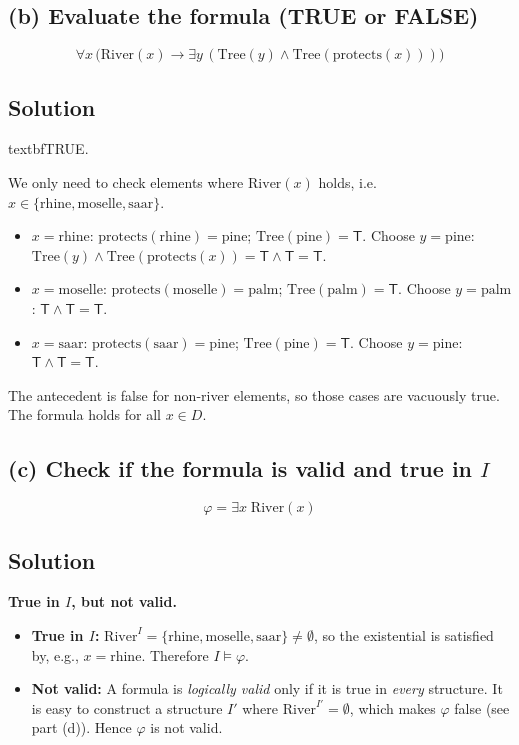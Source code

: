 \documentclass[11pt,a4paper]{article}
\newenvironment{solution}{%
	\begin{tcolorbox}[
		breakable,
		colback=green!4,
		colframe=green!50!black,
		fonttitle=\bfseries,
		title={ Solution},
		left=6pt, right=6pt, top=4pt, bottom=4pt
		]%
	}{%
	\end{tcolorbox}%
}
\begin{document}
\subsection*{(b) Evaluate the formula (TRUE or FALSE)}
\[
\forall x\,\bigl(\mathrm{River}(x) \to \exists y\,(\mathrm{Tree}(y) \land \mathrm{Tree}(\mathrm{protects}(x)))\bigr)
\]

\subsection*{Solution}
\begin{solution}
textbf{TRUE.}

We only need to check elements where $\mathrm{River}(x)$ holds, i.e.\ $x \in \{\text{rhine},\text{moselle},\text{saar}\}$.

\begin{itemize}
  \item $x = \text{rhine}$: $\mathrm{protects}(\text{rhine}) = \text{pine}$; $\mathrm{Tree}(\text{pine}) = \mathsf{T}$.
        Choose $y = \text{pine}$: $\mathrm{Tree}(y) \land \mathrm{Tree}(\mathrm{protects}(x)) = \mathsf{T} \land \mathsf{T} = \mathsf{T}$. \checkmark
  \item $x = \text{moselle}$: $\mathrm{protects}(\text{moselle}) = \text{palm}$; $\mathrm{Tree}(\text{palm}) = \mathsf{T}$.
        Choose $y = \text{palm}$: $\mathsf{T} \land \mathsf{T} = \mathsf{T}$. \checkmark
  \item $x = \text{saar}$: $\mathrm{protects}(\text{saar}) = \text{pine}$; $\mathrm{Tree}(\text{pine}) = \mathsf{T}$.
        Choose $y = \text{pine}$: $\mathsf{T} \land \mathsf{T} = \mathsf{T}$. \checkmark
\end{itemize}

The antecedent is false for non-river elements, so those cases are vacuously true. The formula holds for all $x \in D$.
\end{solution}

\subsection*{(c) Check if the formula is valid and true in $I$}
\[
\varphi = \exists x\;\mathrm{River}(x)
\]

\subsection*{Solution}
\begin{solution}
\textbf{True in $I$, but not valid.}

\begin{itemize}
  \item \textbf{True in $I$:} $\mathrm{River}^I = \{\text{rhine},\text{moselle},\text{saar}\} \neq \emptyset$, so the existential is satisfied by, e.g., $x = \text{rhine}$. Therefore $I \models \varphi$.
  \item \textbf{Not valid:} A formula is \emph{logically valid} only if it is true in \emph{every} structure. It is easy to construct a structure $I'$ where $\mathrm{River}^{I'} = \emptyset$, which makes $\varphi$ false (see part (d)). Hence $\varphi$ is not valid.
\end{itemize}
\end{solution}
\end{document}
